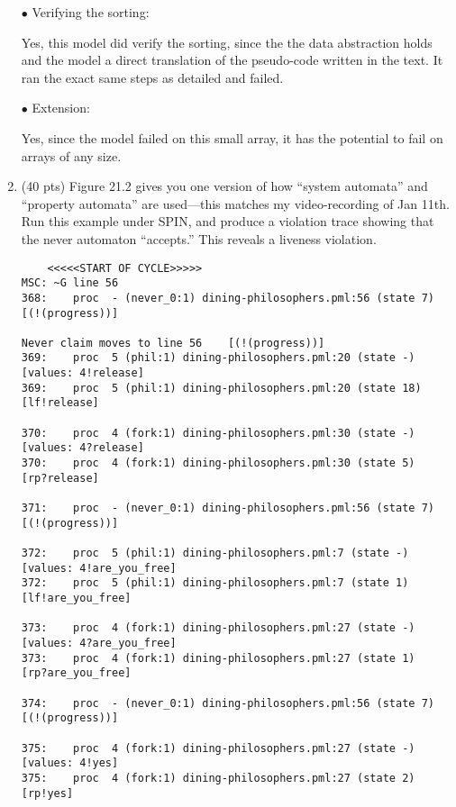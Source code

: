 \documentclass[11pt]{article}
\begin{document}
\begin{enumerate}
{{    $\bullet$ Verifying the sorting:
    
    Yes, this model did verify the sorting, since the the data abstraction holds and the model a direct translation of the pseudo-code written in the text. It ran the exact same steps as detailed and failed.
    
    $\bullet$ Extension:
    
    Yes, since the model failed on this small array, it has the potential to fail on arrays of any size. 
    }%
  }%

    \clearpage
  
  \item (40 pts) Figure 21.2 gives you one version of how ``system automata''
    and ``property automata'' are used---this matches my video-recording
    of Jan 11th.
    Run this example under SPIN, and produce a violation trace showing that
    the never automaton ``accepts.'' This reveals a liveness violation.
    
     \begin{scriptsize}
    \begin{verbatim}
    <<<<<START OF CYCLE>>>>>
MSC: ~G line 56
368:    proc  - (never_0:1) dining-philosophers.pml:56 (state 7)        [(!(progress))]

Never claim moves to line 56    [(!(progress))]
369:    proc  5 (phil:1) dining-philosophers.pml:20 (state -)   [values: 4!release]
369:    proc  5 (phil:1) dining-philosophers.pml:20 (state 18)  [lf!release]

370:    proc  4 (fork:1) dining-philosophers.pml:30 (state -)   [values: 4?release]
370:    proc  4 (fork:1) dining-philosophers.pml:30 (state 5)   [rp?release]

371:    proc  - (never_0:1) dining-philosophers.pml:56 (state 7)        [(!(progress))]

372:    proc  5 (phil:1) dining-philosophers.pml:7 (state -)    [values: 4!are_you_free]
372:    proc  5 (phil:1) dining-philosophers.pml:7 (state 1)    [lf!are_you_free]

373:    proc  4 (fork:1) dining-philosophers.pml:27 (state -)   [values: 4?are_you_free]
373:    proc  4 (fork:1) dining-philosophers.pml:27 (state 1)   [rp?are_you_free]

374:    proc  - (never_0:1) dining-philosophers.pml:56 (state 7)        [(!(progress))]

375:    proc  4 (fork:1) dining-philosophers.pml:27 (state -)   [values: 4!yes]
375:    proc  4 (fork:1) dining-philosophers.pml:27 (state 2)   [rp!yes]


\end{verbatim}
\end{scriptsize}
\end{enumerate}
\end{document}
